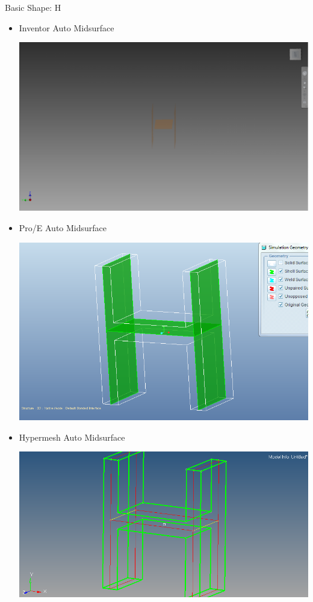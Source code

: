 
\begin{frame}{Basic Shape: H}
\begin{itemize}[noitemsep,label=\textbullet,topsep=2pt,parsep=2pt,partopsep=2pt]

\item Inventor Auto Midsurface

\includegraphics[scale=0.11]{../Common/images/Inventor_H_Mids.png}

\item Pro/E Auto Midsurface

\includegraphics[scale=0.15]{../Common/images/ProeHautoPairs.png}

\item Hypermesh Auto Midsurface

\includegraphics[scale=0.18]{../Common/images/HypermeshHauto.png}


\end{itemize}
\end{frame}
